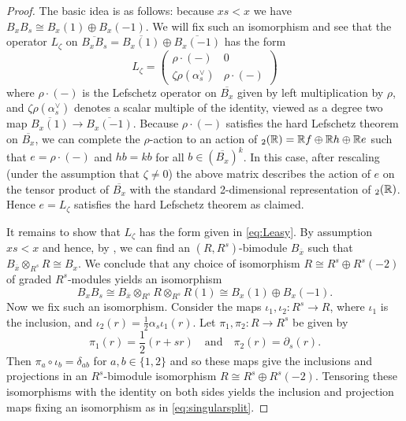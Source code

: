 \documentclass[11pt]{amsart}
\numberwithin{equation}{section}
\def\a{\alpha}
\def\z{\zeta}
\def\to{\rightarrow}
\theoremstyle{definition}
\theoremstyle{remark}
\begin{document}
{\begin{proof}
  The basic idea is as follows: because $xs < x$ we have $B_xB_s \cong
  B_x(1) \oplus B_x(-1)$. We will fix such an isomorphism and see that the operator 
  $L_\z$ on $\overline{B_xB_s} = \overline{B_x(1)} \oplus \overline{B_x(-1)}$ has the form
\begin{equation} \label{eq:Leasy} L_\z = 
\left (
\begin{matrix}
\rho \cdot (-)  & 0 \\
\z \rho(\a_s^\vee)  &  \rho \cdot (-) \end{matrix} \right )
\end{equation}
where $\rho \cdot (-)$ is the Lefschetz operator on $\overline{B_x}$ given by left
multiplication by $\rho$, and $\z \rho(\alpha_s^\vee)$ denotes a
scalar multiple of the identity, viewed as a degree two map
$\overline{B_x(1)} \to \overline{B_x(-1)}$. Because $\rho \cdot (- )$
satisfies the hard Lefschetz theorem on $\overline{B_x}$, we can
complete the $\rho$-action to an action of $\sl_2({\mathbb{R}}) = {\mathbb{R}} f \oplus
{\mathbb{R}} h \oplus {\mathbb{R}} e$ such that $e = \rho \cdot ( - )$ and $h b = k b$
for all $b \in (\overline{B_x})^k$. In this case, after rescaling
(under the assumption that $\z \ne 0$) the
above matrix describes the action of $e$ on the tensor product of
$\overline{B_x}$ with the standard 2-dimensional representation of
$\sl_2({\mathbb{R}})$. Hence $e = L_\z$ satisfies the hard Lefschetz theorem as
claimed.

It remains to show that $L_\z$ has the form given in
\eqref{eq:Leasy}. By assumption $xs < x$ and hence, by \cite [Theorem
1.4]{W}, we can find an $(R, R^s)$-bimodule $B_{\overline{x}}$ such
that $B_{\overline{x}} \otimes_{R^s} R \cong B_x$. We conclude that
any choice of isomorphism $R \cong R^s \oplus R^s(-2)$ of graded
$R^s$-modules yields an isomorphism
\begin{equation} \label{eq:singularsplit}
B_xB_s \cong B_{\overline{x}} \otimes_{R^s} R \otimes_{R^s} R(1) \cong
B_x(1) \oplus B_x(-1).
\end{equation}
Now we fix such an isomorphism. Consider the maps $\iota_1, \iota_2 :
R^s \to R$, where $\iota_1$ is the inclusion, and $\iota_2(r) =
\frac{1}{2}\alpha_s\iota_1(r)$. Let $\pi_1, \pi_2 : R \to R^s$ be
given by
\[
\pi_1(r) = \frac{1}{2}(r + sr) \quad \text{and} \quad \pi_2(r) = \partial_s(r).
\]
Then $\pi_a \circ \iota_b = \delta_{ab} $ for $a, b \in \{ 1, 2 \}$ and so these maps give
the inclusions and projections in an $R^s$-bimodule isomorphism $R \cong
R^s \oplus R^s(-2)$. Tensoring these isomorphisms with the identity on
both sides yields the inclusion and projection maps fixing an
isomorphism as in \eqref{eq:singularsplit}.


\end{proof}}
\end{document}
